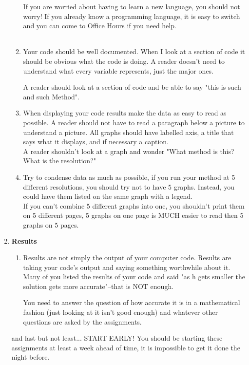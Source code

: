 \documentclass[8pt]{article}
\begin{document}
\begin{enumerate}
\begin{enumerate}
If you are worried about having to learn a new language, you should not worry! If you already know a programming language, it is easy to switch and you can come to Office Hours if you need help.\\ \\


\item  Your code should be well documented.  When I look at a section of code it should be obvious what the code is doing.  A reader doesn't need to understand what every variable represents, just the major ones.

A reader should look at a section of code and be able to say "this is such and such Method".\\


\item When displaying your code results make the data as easy to read as possible.  A reader should not have to read a paragraph below a picture to understand a picture.  All graphs should have labelled axis, a title that says what it displays, and if necessary a caption.  \\

A reader shouldn't look at a graph and wonder "What method is this? What is the resolution?"\\

\item Try to condense data as much as possible, if you run your method at 5 different resolutions, you should try not to have 5 graphs.  Instead, you could have them listed on the same graph with a legend.  \\

If you can't combine 5 different graphs into one, you shouldn't print them on 5 different pages, 5 graphs on one page is MUCH easier to read then 5 graphs on 5 pages.

\end{enumerate}

\item \textbf{Results}\\

\begin{enumerate}

\item Results are not simply the output of your computer code.  Results are taking your code's output and saying something worthwhile about it.  \\

Many of you listed the results of your code and said "as h gets smaller the solution gets more accurate"--that is NOT enough.  

You need to answer the question of how accurate it is in a mathematical fashion (just looking at it isn't good enough) and whatever other questions are asked by the assignments.



\end{enumerate}


and last but not least... START EARLY! You should be starting these assignments at least a week ahead of time, it is impossible to get it done the night before.



\end{enumerate}
\end{document}

